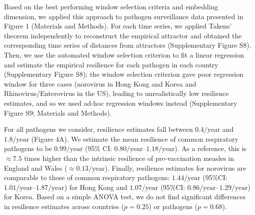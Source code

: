 \documentclass[12pt]{article}
\begin{document}

Based on the best performing window selection criteria and embedding dimension, we applied this approach to pathogen surveillance data presented in Figure 1 (Materials and Methods).
For each time series, we applied Takens' theorem independently to reconstruct the empirical attractor and obtained the corresponding time series of distances from attractors (Supplementary Figure S8).
Then, we use the automated window selection criterion to fit a linear regression and estimate the empirical resilience for each pathogen in each country (Supplementary Figure S8);
the window selection criterion gave poor regression window for three cases (norovirus in Hong Kong and Korea and Rhinovirus/Enterovirus in the US), leading to unrealistically low resilience estimates, and so we used ad-hoc regression windows instead (Supplementary Figure S9; Materials and Methods).

For all pathogens we consider, resilience estimates fall between $0.4/\mathrm{year}$ and $1.8/\mathrm{year}$ (Figure 4A).
We estimate the mean resilience of common respiratory pathogens to be $0.99/\mathrm{year}$ (95\% CI: $0.80/\mathrm{year}$--$1.18/\mathrm{year}$).
As a reference, this is $\approx 7.5$ times higher than the intrinsic resilience of pre-vaccination measles in England and Wales ($\approx 0.13/\mathrm{year}$).
Finally, resilience estimates for norovirus are comparable to those of common respiratory pathogens: $1.44/\mathrm{year}$ (95\%CI: $1.01/\mathrm{year}$--$1.87/\mathrm{year}$) for Hong Kong and $1.07/\mathrm{year}$ (95\%CI: $0.86/\mathrm{year}$--$1.29/\mathrm{year}$) for Korea.
Based on a simple ANOVA test, we do not find significant differences in resilience estimates across countries ($p=0.25$) or pathogens ($p=0.68$).
\end{document}
